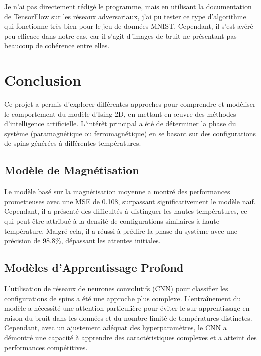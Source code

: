 \documentclass[11pt, parskip=half]{scrartcl} %
\begin{document}
Je n'ai pas directement rédigé le programme, mais en utilisant la documentation de TensorFlow sur les réseaux adversariaux, j'ai pu tester ce type d'algorithme qui fonctionne très bien pour le jeu de données MNIST. Cependant, il s'est avéré peu efficace dans notre cas, car il s'agit d'images de bruit ne présentant pas beaucoup de cohérence entre elles.


\section*{Conclusion}


Ce projet a permis d'explorer différentes approches pour comprendre et modéliser le comportement du modèle d'Ising 2D, en mettant en œuvre des méthodes d'intelligence artificielle. L'intérêt principal a été de déterminer la phase du système (paramagnétique ou ferromagnétique) en se basant sur des configurations de spins générées à différentes températures.

\subsection*{Modèle de Magnétisation}

Le modèle basé sur la magnétisation moyenne a montré des performances prometteuses avec une MSE de 0.108, surpassant significativement le modèle naïf. Cependant, il a présenté des difficultés à distinguer les hautes températures, ce qui peut être attribué à la densité de configurations similaires à haute température. Malgré cela, il a réussi à prédire la phase du système avec une précision de 98.8\%, dépassant les attentes initiales.

\subsection*{Modèles d'Apprentissage Profond}

L'utilisation de réseaux de neurones convolutifs (CNN) pour classifier les configurations de spins a été une approche plus complexe. L'entraînement du modèle a nécessité une attention particulière pour éviter le sur-apprentissage en raison du bruit dans les données et du nombre limité de températures distinctes. Cependant, avec un ajustement adéquat des hyperparamètres, le CNN a démontré une capacité à apprendre des caractéristiques complexes et a atteint des performances compétitives.
\end{document}
